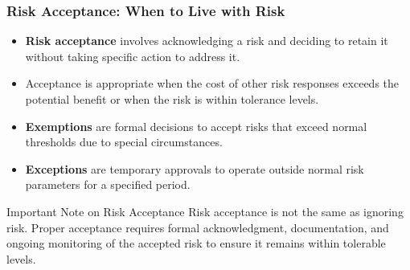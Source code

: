 \documentclass{beamer}
\begin{document}
          \begin{frame}
          \frametitle{Risk Acceptance: When to Live with Risk}
          \begin{itemize}
            \item \textbf{Risk acceptance} involves acknowledging a risk and deciding to retain it without taking specific action to address it.
            \item Acceptance is appropriate when the cost of other risk responses exceeds the potential benefit or when the risk is within tolerance levels.
            \item \textbf{Exemptions} are formal decisions to accept risks that exceed normal thresholds due to special circumstances.
            \item \textbf{Exceptions} are temporary approvals to operate outside normal risk parameters for a specified period.
          \end{itemize}
          
          \begin{alertblock}{Important Note on Risk Acceptance}
          Risk acceptance is not the same as ignoring risk. Proper acceptance requires formal acknowledgment, documentation, and ongoing monitoring of the accepted risk to ensure it remains within tolerable levels.
          \end{alertblock}
          \end{frame}
\end{document}
